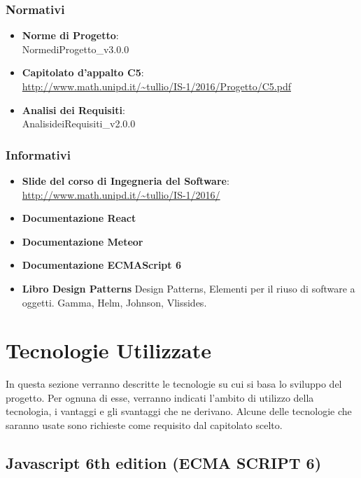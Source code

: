 \subsubsection{Normativi}
\begin{itemize}
	\item \textbf{Norme di Progetto}: \\ NormediProgetto\_v3.0.0
	\item \textbf{Capitolato d'appalto C5}: \\ \url{http://www.math.unipd.it/~tullio/IS-1/2016/Progetto/C5.pdf}
	\item \textbf{Analisi dei Requisiti}: \\ AnalisideiRequisiti\_v2.0.0
	
\end{itemize}


\subsubsection{Informativi}
\begin{itemize}
	\item \textbf{Slide del corso di Ingegneria del Software}:
     \\  \url{http://www.math.unipd.it/~tullio/IS-1/2016/ }
\item \textbf{Documentazione React}
\item \textbf{Documentazione Meteor}
\item \textbf{Documentazione ECMAScript 6} 
\item \textbf{Libro Design Patterns} Design Patterns, Elementi per il
  riuso di software a oggetti. Gamma, Helm, Johnson, Vlissides.

\end{itemize}

\section{Tecnologie Utilizzate}

In questa sezione verranno descritte le tecnologie su cui si basa lo
sviluppo del progetto. Per ognuna di esse, verranno indicati l’ambito
di utilizzo della tecnologia, i vantaggi e gli svantaggi che ne
derivano. Alcune delle tecnologie che saranno usate sono richieste come requisito dal capitolato scelto.

\subsection{Javascript 6th edition (ECMA SCRIPT 6)}

